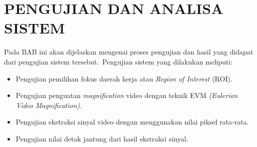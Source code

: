 \chapter{PENGUJIAN DAN ANALISA SISTEM}

\ifpdf
    \graphicspath{{Chapter4/Figs/tinggi/}{Chapter4/Figs/idv/}{Chapter4/Figs/}}
\else
    \graphicspath{{Chapter4/Figs/Vector/}{Chapter4/Figs/}}
\fi
Pada BAB ini akan dijelaskan mengenai proses pengujian dan hasil yang didapat dari pengujian sistem tersebut.~Pengujian sistem yang dilakukan meliputi: 
\begin{itemize}
	\item Pengujian pemilihan fokus daerah kerja atau \textit{Region of Interest} (ROI).
	\item Pengujian penguatan \textit{magnification} video dengan teknik EVM \textit{(Eulerian Video Magnification)}.
	\item Pengujian ekstraksi sinyal video dengan menggunakan nilai piksel rata-rata.
	\item Pengujian nilai detak jantung dari hasil ekstraksi sinyal.
\end{itemize}



